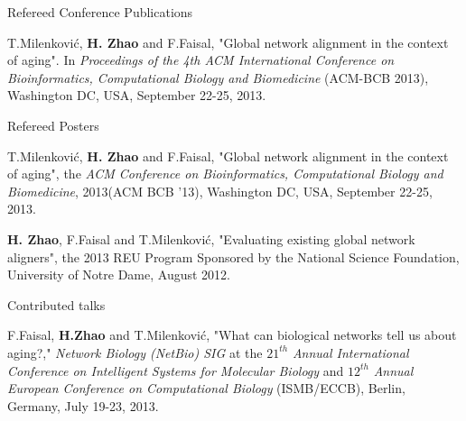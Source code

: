 \documentclass{resume} %
\begin{document}
\begin{rSection}{Refereed Conference Publications}
\item{}T.Milenkovi\'{c}, \textbf{H. Zhao} and F.Faisal, "Global network alignment in the context of aging". In \emph{Proceedings of the 4th ACM International Conference on Bioinformatics, Computational Biology and Biomedicine} (ACM-BCB 2013), Washington DC, USA, September 22-25, 2013.
\end{rSection}


\begin{rSection}{Refereed Posters}
\item{}T.Milenkovi\'{c}, \textbf{H. Zhao} and F.Faisal, "Global network alignment in the context of aging", the \emph{ACM Conference on Bioinformatics, Computational Biology and Biomedicine}, 2013(ACM BCB '13), Washington DC, USA, September 22-25, 2013.
\item{}\textbf{H. Zhao}, F.Faisal and T.Milenkovi\'{c}, "Evaluating existing global network aligners", the 2013 REU Program Sponsored by the National Science Foundation, University of Notre Dame, August 2012.
\end{rSection}



\begin{rSection}{Contributed talks}
\item{}F.Faisal, \textbf{H.Zhao} and T.Milenkovi\'{c}, "What can biological networks tell us about
aging?," \emph{Network Biology (NetBio) SIG} at the $21^{th}$ \emph{Annual International Conference
on Intelligent Systems for Molecular Biology} and $12^{th}$ \emph{Annual European Conference on
Computational Biology} (ISMB/ECCB), Berlin, Germany, July 19-23, 2013.
\end{rSection}
\end{document}

